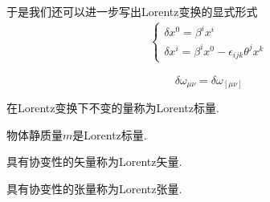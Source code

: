于是我们还可以进一步写出Lorentz变换的显式形式
\begin{align}\label{lorentz-for-vector}
    \begin{cases}
        \delta x^0=\beta^i x^i\\
        \delta x^i=\beta^i x^0-\epsilon_{ijk}\theta^j x^k
    \end{cases}
\end{align}
\begin{theorem}
    \begin{equation}
        \delta\omega_{\mu\nu}=\delta\omega_{[\mu\nu]}
    \end{equation}
\end{theorem}

\begin{definition}[Lorentz标量]
    在Lorentz变换下不变的量称为Lorentz标量.
\end{definition}
\begin{theorem}
    物体静质量$m$是Lorentz标量.
\end{theorem}
\begin{definition}[Lorentz矢量]
    具有协变性的矢量称为Lorentz矢量.
\end{definition}
\begin{definition}[Lorentz张量]
    具有协变性的张量称为Lorentz张量.
\end{definition}

